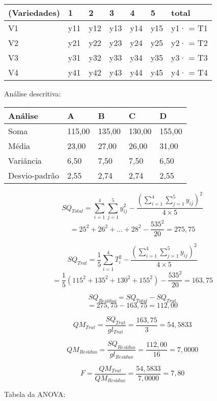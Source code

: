 \documentclass[
]{book}
\begin{document}
\begin{longtable}[]{@{}lllllll@{}}
\toprule()
(Variedades) & 1 & 2 & 3 & 4 & 5 & total \\
\midrule()
\endhead
V1 & y11 & y12 & y13 & y14 & y15 & y1· = T1 \\
V2 & y21 & y22 & y23 & y24 & y25 & y2· = T2 \\
V3 & y31 & y32 & y33 & y34 & y35 & y3· = T3 \\
V4 & y41 & y42 & y43 & y44 & y45 & y4· = T4 \\
\bottomrule()
\end{longtable}

Análise descritiva:

\begin{longtable}[]{@{}lllll@{}}
\toprule()
Análise & A & B & C & D \\
\midrule()
\endhead
Soma & 115,00 & 135,00 & 130,00 & 155,00 \\
Média & 23,00 & 27,00 & 26,00 & 31,00 \\
Variância & 6,50 & 7,50 & 7,50 & 6,50 \\
Desvio-padrão & 2,55 & 2,74 & 2,74 & 2,55 \\
\bottomrule()
\end{longtable}

\[SQ_{Total} = \displaystyle{\sum_{i=1}^4\sum_{j=1}^5y_{ij}^2 - \frac{\left(\sum_{i=1}^4\sum_{j=1}^5y_{ij}\right)^2}{4\times5}}\]
\[ = \displaystyle{25^2 + 26^2 + \ldots + 28^2 - \frac{535^2}{20}} 
 = 275,75\]

\[SQ_{Trat} = \displaystyle{\frac{1}{5}\sum_{i=1}^4 T_i^2 - \frac{\left(\sum_{i=1}^4\sum_{j=1}^5y_{ij}\right)^2}{4\times5}}\]
\[= \displaystyle{\frac{1}{5}\left(115^2 + 135^2 + 130^2 + 155^2\right) - \frac{535^2}{20}}= 163,75\]

\[SQ_{Resíduo} = SQ_{Total} - SQ_{Trat}\]
\[= 275,75 - 163,75 = 112,00\]

\[QM_{Trat} = \displaystyle{\frac{SQ_{Trat}}{gl_{Trat}}}
= \displaystyle{\frac{163,75}{3}} = 54,5833\]

\[QM_{Resíduo} = \displaystyle{\frac{SQ_{Resíduo}}{gl_{Resíduo}}}=\displaystyle{\frac{112,00}{16}}= 7,0000\]

\[F = \displaystyle{\frac{QM_{Trat}}{QM_{Resíduo}}}=\displaystyle{\frac{54,5833}{7,0000}}= 7,80\]

Tabela da ANOVA:
\end{document}
